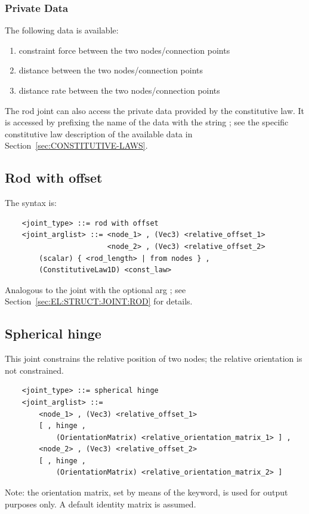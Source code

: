 \subsubsection{Private Data}
The following data is available:
\begin{enumerate}
\item {} constraint force between the two nodes/connection points
\item {} distance between the two nodes/connection points
\item {} distance rate between the two nodes/connection points
\end{enumerate}
The rod joint can also access the private data provided 
by the constitutive law.
It is accessed by prefixing the name of the data with the string
; see the specific constitutive law
description of the available data in Section~\ref{sec:CONSTITUTIVE-LAWS}.





\subsection{Rod with offset}\label{sec:EL:STRUCT:JOINT:ROD_WITH_OFFSET}
The syntax is:
\begin{verbatim}
    <joint_type> ::= rod with offset
    <joint_arglist> ::= <node_1> , (Vec3) <relative_offset_1>
                        <node_2> , (Vec3) <relative_offset_2>
        (scalar) { <rod_length> | from nodes } ,
        (ConstitutiveLaw1D) <const_law>
\end{verbatim}
Analogous to the  joint with the optional arg ;
see Section~\ref{sec:EL:STRUCT:JOINT:ROD} for details.

\subsection{Spherical hinge}
\label{sec:EL:STRUCT:JOINT:SPHERICAL_HINGE}
This joint constrains the relative position of two nodes;
the relative orientation is not constrained.
\begin{verbatim}
    <joint_type> ::= spherical hinge
    <joint_arglist> ::= 
        <node_1> , (Vec3) <relative_offset_1> 
        [ , hinge , 
            (OrientationMatrix) <relative_orientation_matrix_1> ] ,
        <node_2> , (Vec3) <relative_offset_2>
        [ , hinge , 
            (OrientationMatrix) <relative_orientation_matrix_2> ]
\end{verbatim}
Note: the orientation matrix, set by means of the  keyword,
is used for output purposes only. 
A default identity matrix is assumed.

